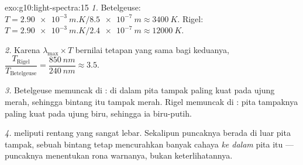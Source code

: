 \begin{solution}{exo:g10:light-spectra:15}
\emph{1.} Betelgeuse:
$T = \qty{2.90e-3}{m.K} / \qty{8.5e-7}{m} \approx \qty{3400}{K}$.
Rigel: $T = \qty{2.90e-3}{m.K} / \qty{2.4e-7}{m} \approx \qty{12000}{K}$.

\emph{2.} Karena $\lambda_{\max} \times T$ bernilai tetapan yang sama
bagi keduanya,
$\dfrac{T_{\text{Rigel}}}{T_{\text{Betelgeuse}}}
= \dfrac{\qty{850}{nm}}{\qty{240}{nm}} \approx 3.5$.

\emph{3.} Betelgeuse memuncak di : di dalam pita tampak
 paling kuat pada ujung merah, sehingga bintang itu tampak
merah. Rigel memuncak di : pita tampaknya paling kuat pada
ujung biru, sehingga ia biru-putih.

\emph{4.}  meliputi rentang  yang
sangat lebar. Sekalipun puncaknya berada di luar pita tampak, sebuah
bintang tetap mencurahkan banyak cahaya \emph{ke dalam} pita itu ---
puncaknya menentukan rona warnanya, bukan keterlihatannya.
\end{solution}

